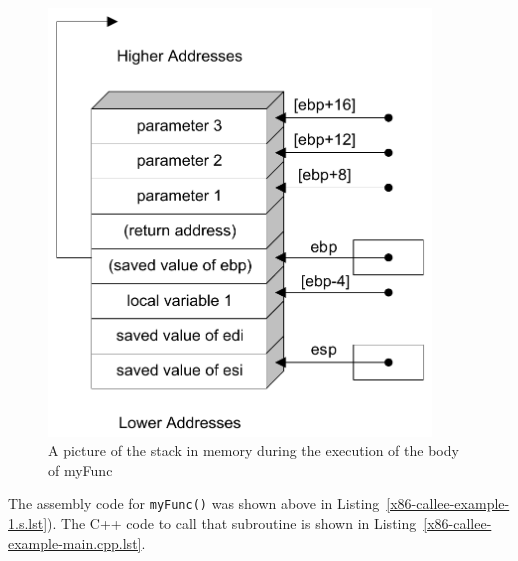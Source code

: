\begin{figure}[h]
\centering
\includegraphics[width=4in]{x86/x86-activation-record.pdf}
\caption{A picture of the stack in memory during the execution of the body of myFunc}
\label{x86-activation-record.fig}
\end{figure}

The assembly code for {\tt myFunc()} was shown above in
Listing~\ref{x86-callee-example-1.s.lst}). The C++ code to call that
subroutine is shown in
Listing~\ref{x86-callee-example-main.cpp.lst}.

\begin{figure}[h!]

\end{figure}




